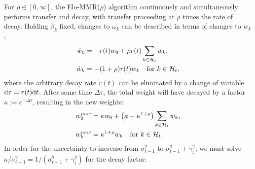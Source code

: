 For $\rho\in [0,\infty]$, the Elo-MMR($\rho$) algorithm continuously and simultaneously performs transfer and decay, with transfer proceeding at $\rho$ times the rate of decay. Holding $\beta_k$ fixed, changes to $\omega_k$ can be described in terms of changes to $w_k$:
\begin{align*}
\dot w_0 &= -r(t)w_0 + \rho r(t) \sum_{k\in{\mathcal{H}}_t} w_k,
\\\dot w_k &= -(1+\rho)r(t)w_k \quad\text{for }k\in{\mathcal{H}}_t,
\end{align*}
where the arbitrary decay rate $r(t)$ can be eliminated by a change of variable $\mathrm{d}\tau = r(t)\mathrm{d}t$. After some time $\Delta\tau$, the total weight will have decayed by a factor $\kappa := e^{-\Delta\tau}$, resulting in the new weights:
\begin{align*}
w_0^{new} &= \kappa w_0 + \left(\kappa-\kappa^{1+\rho}\right)\sum_{k\in{\mathcal{H}}_t} w_k,
\\w_k^{new} &= \kappa^{1+\rho}w_k \quad\text{for }k\in{\mathcal{H}}_t.
\end{align*}
In order for the uncertainty to increase from $\sigma_{t-1}^2$ to $\sigma_{t-1}^2+\gamma_t^2$, we must solve $\kappa/\sigma_{t-1}^2 = 1/(\sigma_{t-1}^2+\gamma_t^2)$ for the decay factor:

